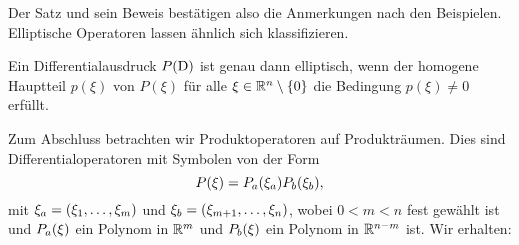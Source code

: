 Der Satz und sein Beweis bestätigen also die Anmerkungen nach den Beispielen.
Elliptische Operatoren lassen ähnlich sich klassifizieren.

\begin{thm}
Ein Differentialausdruck $P(\mathrm D)$ ist genau dann elliptisch,
wenn der homogene Hauptteil $p(\xi)$ von $P(\xi)$ für alle $\xi\in\mathbb R^n\setminus\{0\}$ die Bedingung $p(\xi)\ne0$ erfüllt.
\end{thm}


Zum Abschluss betrachten wir Produktoperatoren auf Produkträumen.
Dies sind Differentialoperatoren mit Symbolen von der Form
\begin{equation}\label{eq:2:prodpol}
P(\xi)=P_a(\xi_a)P_b(\xi_b),
\end{equation}
mit $\xi_a=(\xi_1,\dots,\xi_m)$ und $\xi_b=(\xi_{m+1},\dots,\xi_n)$,
wobei $0<m<n$ fest gewählt ist
und $P_a(\xi)$ ein Polynom in $\mathbb R^m$
und $P_b(\xi)$ ein Polynom in $\mathbb R^{n-m}$ ist.
Wir erhalten:

